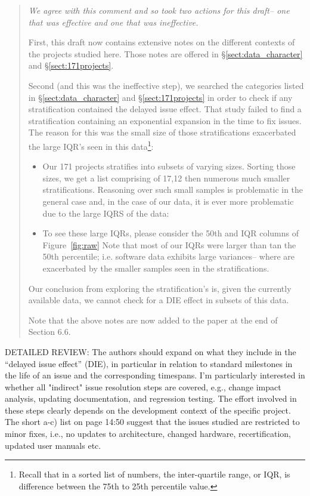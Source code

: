 \documentclass[smallcondensed]{svjour3}
\newcommand{\bi}{\begin{itemize}}%
\newcommand{\ei}{\end{itemize}}
\newcommand{\tion}[1]{\S\ref{sect:#1}}
\begin{document}
\begin{quote}{\em  We agree with this comment and so took two actions for this draft-- one that was effective and one that was ineffective. 

First, this draft now contains extensive notes on the different contexts of the
projects studied here. Those notes are offered in \tion{data_character} and \tion{171projects}.

Second (and this was the ineffective step), we  searched the categories   listed in \tion{data_character} and \tion{171projects}
in order to check if any stratification contained the delayed issue effect. 
That study   failed to find a stratification
containing an exponential expansion in the time to fix issues. The reason for this was  the small size
of those stratifications  exacerbated the large IQR's seen in this data\footnote{Recall that in a sorted list of numbers,
the inter-quartile range, or IQR, is difference between the 
  75th to 25th percentile value.}:
\bi
\item
Our 171 projects   stratifies into subsets of varying sizes. Sorting those sizes, we get a list
comprising of 17,12 then numerous much smaller stratifications.  Reasoning over such small samples
is problematic in the general case and, in the case of our data, it is ever more problematic due to
the large IQRS of the data:
\item
To see these large IQRs,  please consider the 50th and IQR columns of Figure~\ref{fig:raw} Note that most of our IQRs were larger than tan the 50th percentile; i.e. software
data exhibits large variances-- where are exacerbated by the smaller samples seen in the stratifications.
\ei
Our conclusion from exploring the stratification's is, given the currently available data, we cannot check
for a DIE effect in subsets of this data.

Note that the above notes are now added to the paper at the end of Section 6.6.
 }\end{quote}



DETAILED REVIEW: The authors should expand on what they
include in the ``delayed issue effect'' (DIE), in particular
in relation to standard milestones in the life of an issue
and the corresponding timespans.  I'm particularly
interested in whether all "indirect" issue resolution steps
are covered, e.g., change impact analysis, updating
documentation, and regression testing. The effort involved
in these steps clearly depends on the development context of
the specific project. The short a-c) list on page 14:50
suggest that the issues studied are restricted to minor
fixes, i.e., no updates to architecture, changed hardware,
recertification, updated user manuals etc.
\end{document}
